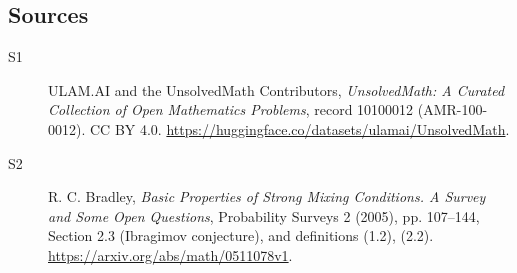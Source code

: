 \documentclass[11pt]{article}
\begin{document}
\subsection{Sources}
\begin{description}
\item[\hypertarget{source:10100012:1}{S1}] ULAM.AI and the UnsolvedMath Contributors, \emph{UnsolvedMath: A Curated Collection of Open Mathematics Problems}, record 10100012 (AMR-100-0012). CC BY 4.0. \url{https://huggingface.co/datasets/ulamai/UnsolvedMath}.
\item[\hypertarget{source:10100012:2}{S2}] R. C. Bradley, \emph{Basic Properties of Strong Mixing Conditions. A Survey and Some Open Questions}, Probability Surveys 2 (2005), pp. 107--144, Section 2.3 (Ibragimov conjecture), and definitions (1.2), (2.2). \url{https://arxiv.org/abs/math/0511078v1}.
\end{description}
\label{end:10100012}
\end{document}
